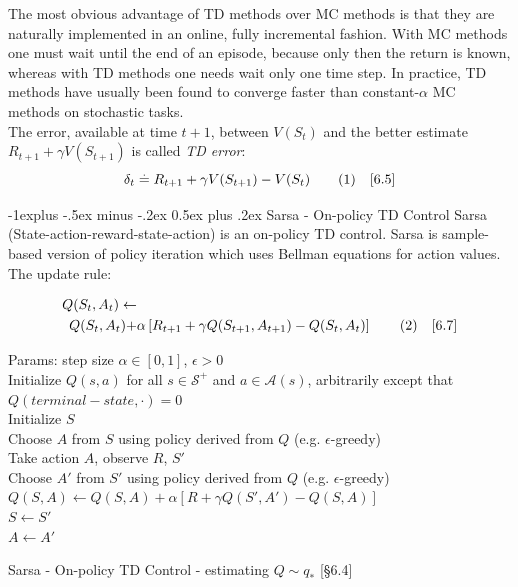 \documentclass[10pt,landscape]{article}
\makeatletter
\renewcommand{\subsection}{\@startsection{subsection}{2}{0mm}%
                                {-1explus -.5ex minus -.2ex}%
                                {0.5ex plus .2ex}%
                                {\normalfont\normalsize\bfseries}}
\newcommand\numberthis{\addtocounter{equation}{1}\tag{\theequation}}
\makeatother
\begin{document}
\begin{multicols}{3}
The most obvious advantage of TD methods over MC methods is that they are naturally implemented in an online, fully incremental fashion. 
With MC methods one must wait until the end of an episode, because only then the return is known, whereas with TD methods one needs wait only one time step.
In practice, TD methods have usually been found to converge faster than constant-$\alpha$ MC methods on stochastic tasks.\\
The error, available at time $t+1$, between $V(S_t)$ and the better estimate $R_{t+1} + \gamma V(S_{t+1})$ is called \emph{TD error}:
\begin{equation*}
\delta_t \stackrel{.}{=} R_{t+1} + \gamma V(S_{t+1}) - V(S_t) \numberthis  \quad [6.5]
\end{equation*}

\subsection{Sarsa - On-policy TD Control}
Sarsa (State-action-reward-state-action) is an on-policy TD control. 
Sarsa is sample-based version of policy iteration which uses Bellman equations for action values. 
The update rule:

\begin{align*}
    Q(S_t, A_t) \leftarrow & \\
    Q(S_t, A_t) + & \alpha \left[R_{t+1} + \gamma Q(S_{t+1}, A_{t+1}) - Q(S_t, A_t) \right] \numberthis  \quad [6.7]
\end{align*}

\begin{algorithm}[H]
 Params: step size $\alpha \in [0,1]$, $\epsilon > 0$ \\
 Initialize $Q(s,a)$ for all $s \in \mathcal{S}^+$ and $a \in \mathcal{A}(s)$, arbitrarily except that $Q(terminal-state, \cdot) = 0$\\
{
    Initialize $S$\\
    Choose $A$ from $S$ using policy derived from $Q$ (e.g. $\epsilon$-greedy)\\
    {
      Take action $A$, observe $R$, $S'$\\
    	Choose $A'$ from $S'$ using policy derived from $Q$ (e.g. $\epsilon$-greedy)\\
      $Q(S, A) \leftarrow Q(S, A) + \alpha \left[R + \gamma Q(S', A') - Q(S, A)  \right]$\\
    	$S \leftarrow S'$\\
    	$A \leftarrow A'$ 
    }
 }
\caption{Sarsa - On-policy TD Control - estimating $Q \sim q_*$  [§6.4]}
\end{algorithm}


\end{multicols}
\end{document}
